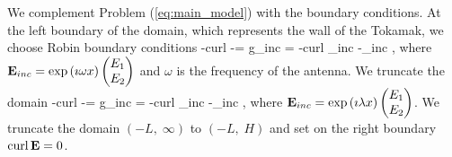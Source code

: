 We complement Problem (\ref{eq:main_model}) with the boundary conditions.
At the left boundary of the domain, which represents the wall of the Tokamak, we choose Robin boundary conditions 
\be
-curl \E -\imath \omega\E \wedge \n = g_{inc} = -curl \E_{inc} -\imath\omega\E_{inc} \wedge \n,
\ee
where ${\bf E}_{inc} = \exp \left(\imath \omega x\right)\begin{pmatrix} E_1\\ E_2 \end{pmatrix}$ and $\omega$ is 
the frequency of the antenna.
We truncate the domain 
\ben
-curl \E -\imath \lambda\E \wedge \n = g_{inc} = -curl \E_{inc} -\imath\lambda\E_{inc} \wedge \n,
\een
where ${\bf E}_{inc} = \exp \left(\imath \lambda x\right)\begin{pmatrix} E_1\\ E_2 \end{pmatrix}$. We truncate the domain 
$(-L,\; \infty)$ to $(-L,\; H)$ and set on the right boundary $\operatorname{curl} {\bf E} = 0$. 

